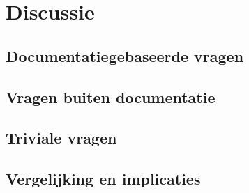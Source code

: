 
\chapter{Discussie}
\label{ch:discussie}

\section{Documentatiegebaseerde vragen}

\section{Vragen buiten documentatie}

\section{Triviale vragen}

\section{Vergelijking en implicaties}